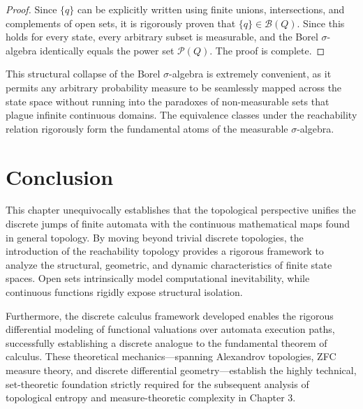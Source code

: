 \begin{proof}
Since $\{q\}$ can be explicitly written using finite unions, intersections, and complements of open sets, it is rigorously proven that $\{q\} \in \mathcal{B}(Q)$. Since this holds for every state, every arbitrary subset is measurable, and the Borel $\sigma$-algebra identically equals the power set $\mathcal{P}(Q)$. The proof is complete.
\end{proof}

This structural collapse of the Borel $\sigma$-algebra is extremely convenient, as it permits any arbitrary probability measure to be seamlessly mapped across the state space without running into the paradoxes of non-measurable sets that plague infinite continuous domains. The equivalence classes under the reachability relation rigorously form the fundamental atoms of the measurable $\sigma$-algebra.

\section{Conclusion}

This chapter unequivocally establishes that the topological perspective unifies the discrete jumps of finite automata with the continuous mathematical maps found in general topology. By moving beyond trivial discrete topologies, the introduction of the reachability topology provides a rigorous framework to analyze the structural, geometric, and dynamic characteristics of finite state spaces. Open sets intrinsically model computational inevitability, while continuous functions rigidly expose structural isolation.

Furthermore, the discrete calculus framework developed enables the rigorous differential modeling of functional valuations over automata execution paths, successfully establishing a discrete analogue to the fundamental theorem of calculus. These theoretical mechanics—spanning Alexandrov topologies, ZFC measure theory, and discrete differential geometry—establish the highly technical, set-theoretic foundation strictly required for the subsequent analysis of topological entropy and measure-theoretic complexity in Chapter 3.